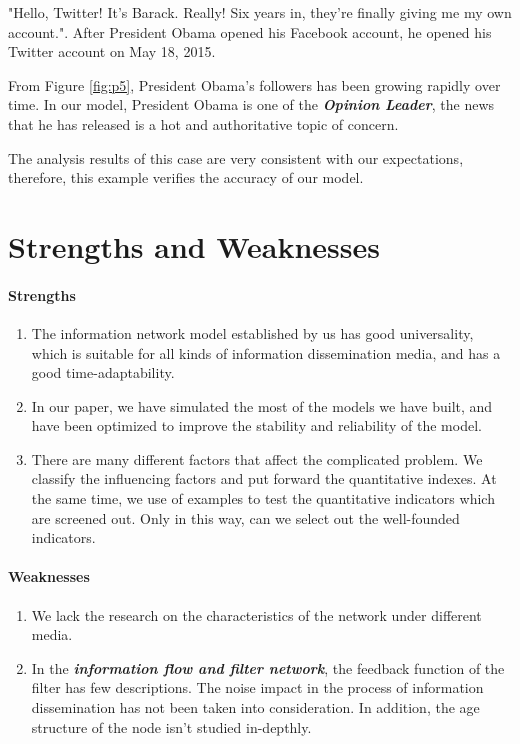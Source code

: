 \documentclass[a4paper,11pt]{article}
\begin{document}
\par "Hello, Twitter! It's Barack. Really! Six years in, they're finally giving me my own account.". After President Obama opened his Facebook account, he opened his Twitter account on May 18, 2015.
\par From Figure \ref{fig:p5}, President Obama's followers has been growing rapidly over time. In our model, President Obama is one of the \textbf{\emph{Opinion Leader}}, the news that he has released is a hot and authoritative topic of concern.
\par The analysis results of this case are very consistent with our expectations, therefore, this example verifies the accuracy of our model.




\section{Strengths and Weaknesses}

\paragraph{Strengths}
\text{\\}
\begin{enumerate}%
\renewcommand{\labelenumi}{(\theenumi)}
    \item The information network model established by us has good universality, which is suitable for all kinds of information dissemination media, and has a good time-adaptability.
    \item In our paper, we have simulated the most of the models we have built, and have been optimized to improve the stability and reliability of the model.
    \item There are many different factors that affect the complicated problem. We classify the influencing factors and put forward the quantitative indexes. At the same time, we use of examples to test the quantitative indicators which are screened out. Only in this way, can we select out the well-founded indicators.
\end{enumerate}


\paragraph{Weaknesses}
\begin{enumerate}%
\renewcommand{\labelenumi}{(\theenumi)}
    \item We lack the research on the characteristics of the network under different media.
    \item In the \emph{\textbf{information flow and filter network}}, the feedback function of the filter has few descriptions. The noise impact in the process of information dissemination has not been taken into consideration. In addition, the age structure of the node isn't studied in-depthly.
\end{enumerate}
\end{document}
